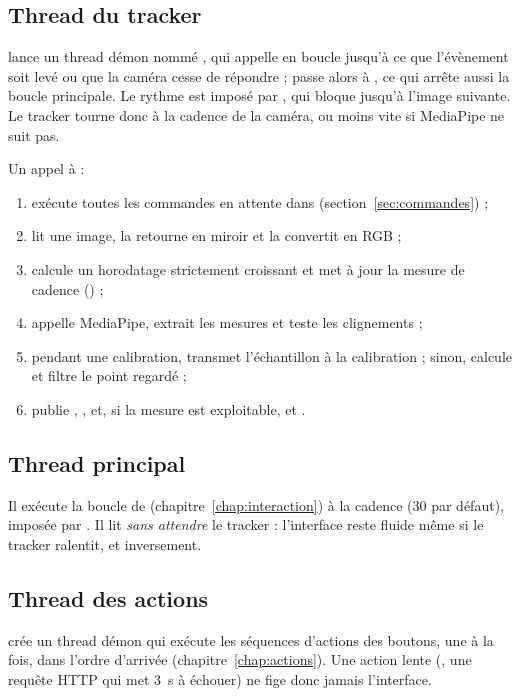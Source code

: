 \subsection{Thread du tracker}

 lance un thread démon nommé , qui appelle  en boucle jusqu'à ce que l'évènement  soit levé ou que la caméra cesse de répondre ;  passe alors à , ce qui arrête aussi la boucle principale. Le rythme est imposé par , qui bloque jusqu'à l'image suivante. Le tracker tourne donc à la cadence de la caméra, ou moins vite si MediaPipe ne suit pas.

Un appel à  :
\begin{enumerate}
  \item exécute toutes les commandes en attente dans  (section~\ref{sec:commandes}) ;
  \item lit une image, la retourne en miroir et la convertit en RGB ;
  \item calcule un horodatage strictement croissant et met à jour la mesure de cadence () ;
  \item appelle MediaPipe, extrait les mesures et teste les clignements ;
  \item pendant une calibration, transmet l'échantillon à la calibration ; sinon, calcule et filtre le point regardé ;
  \item publie , ,  et, si la mesure est exploitable,  et .
\end{enumerate}

\subsection{Thread principal}

Il exécute la boucle de  (chapitre~\ref{chap:interaction}) à la cadence  (\num{30} par défaut), imposée par . Il lit  \emph{sans attendre} le tracker : l'interface reste fluide même si le tracker ralentit, et inversement.

\subsection{Thread des actions}

 crée un thread démon  qui exécute les séquences d'actions des boutons, une à la fois, dans l'ordre d'arrivée (chapitre~\ref{chap:actions}). Une action lente (, une requête HTTP qui met \qty{3}{\second} à échouer) ne fige donc jamais l'interface.

